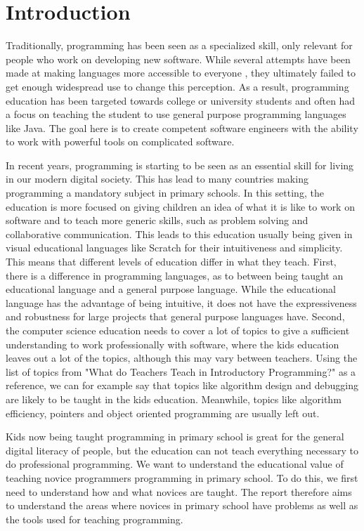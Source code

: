 \chapter{Introduction}
\label{chap:introduction}
Traditionally, programming has been seen as a specialized skill, only relevant for people who work on developing new software.
While several attempts have been made at making languages more accessible to everyone \cite{turtle_func, smallbasic_faq}, they ultimately failed to get enough widespread use to change this perception.
As a result, programming education has been targeted towards college or university students and often had a focus on teaching the student to use general purpose programming languages like Java\cite{tiobe}.
The goal here is to create competent software engineers with the ability to work with powerful tools on complicated software.

In recent years, programming is starting to be seen as an essential skill for living in our modern digital society.
This has lead to many countries making programming a mandatory subject in primary schools. In this setting, the education is more focused on giving children an idea of what it is like to work on software and to teach more generic skills, such as problem solving and collaborative communication. This leads to this education usually being given in visual educational languages like Scratch \cite{MaloneyResnick10} for their intuitiveness and simplicity. This means that different levels of education differ in what they teach.
First, there is a difference in programming languages, as to between being taught an educational language and a general purpose language. While the educational language has the advantage of being intuitive, it does not have the expressiveness and robustness for large projects that general purpose languages have.
Second, the computer science education needs to cover a lot of topics to give a sufficient understanding to work professionally with software, where the kids education leaves out a lot of the topics, although this may vary between teachers.
Using the list of topics from "What do Teachers Teach in Introductory Programming?"\cite{WhatDoTeach06} as a reference, we can for example say that topics like algorithm design and debugging are likely to be taught in the kids education. Meanwhile, topics like algorithm efficiency, pointers and object oriented programming are usually left out.

Kids now being taught programming in primary school is great for the general digital literacy of people, but the education can not teach everything necessary to do professional programming.
We want to understand the educational value of teaching novice programmers programming in primary school. To do this, we first need to understand how and what novices are taught. The report therefore aims to understand the areas where novices in primary school have problems as well as the tools used for teaching programming.

